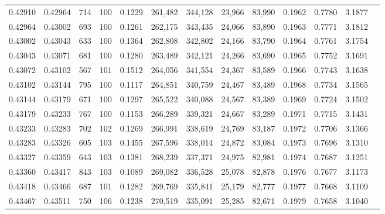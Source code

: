 \begin{tabular}{rrrrrrrrrrrrr}
0.42910 & 0.42964 &   714 & 100 &                                     0.1229 & 261,482 & 344,128 &  23,966 &  83,990 & 0.1962 & 0.7780 & 3.1877 \\
0.42964 & 0.43002 &   693 & 100 &                                     0.1261 & 262,175 & 343,435 &  24,066 &  83,890 & 0.1963 & 0.7771 & 3.1812 \\
0.43002 & 0.43043 &   633 & 100 &                                     0.1364 & 262,808 & 342,802 &  24,166 &  83,790 & 0.1964 & 0.7761 & 3.1754 \\
0.43043 & 0.43071 &   681 & 100 &                                     0.1280 & 263,489 & 342,121 &  24,266 &  83,690 & 0.1965 & 0.7752 & 3.1691 \\
0.43072 & 0.43102 &   567 & 101 &                                     0.1512 & 264,056 & 341,554 &  24,367 &  83,589 & 0.1966 & 0.7743 & 3.1638 \\
0.43102 & 0.43144 &   795 & 100 &                                     0.1117 & 264,851 & 340,759 &  24,467 &  83,489 & 0.1968 & 0.7734 & 3.1565 \\
0.43144 & 0.43179 &   671 & 100 &                                     0.1297 & 265,522 & 340,088 &  24,567 &  83,389 & 0.1969 & 0.7724 & 3.1502 \\
0.43179 & 0.43233 &   767 & 100 &                                     0.1153 & 266,289 & 339,321 &  24,667 &  83,289 & 0.1971 & 0.7715 & 3.1431 \\
0.43233 & 0.43283 &   702 & 102 &                                     0.1269 & 266,991 & 338,619 &  24,769 &  83,187 & 0.1972 & 0.7706 & 3.1366 \\
0.43283 & 0.43326 &   605 & 103 &                                     0.1455 & 267,596 & 338,014 &  24,872 &  83,084 & 0.1973 & 0.7696 & 3.1310 \\
0.43327 & 0.43359 &   643 & 103 &                                     0.1381 & 268,239 & 337,371 &  24,975 &  82,981 & 0.1974 & 0.7687 & 3.1251 \\
0.43360 & 0.43417 &   843 & 103 &                                     0.1089 & 269,082 & 336,528 &  25,078 &  82,878 & 0.1976 & 0.7677 & 3.1173 \\
0.43418 & 0.43466 &   687 & 101 &                                     0.1282 & 269,769 & 335,841 &  25,179 &  82,777 & 0.1977 & 0.7668 & 3.1109 \\
0.43467 & 0.43511 &   750 & 106 &                                     0.1238 & 270,519 & 335,091 &  25,285 &  82,671 & 0.1979 & 0.7658 & 3.1040 \\

\end{tabular}
